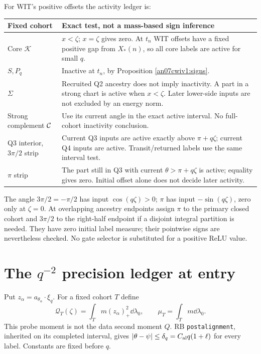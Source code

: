 \documentclass[11pt]{article}
\numberwithin{equation}{section}
\theoremstyle{remark}\newtheorem{remark}[theorem]{Remark}
\newcommand{\KK}{\mathcal K}\newcommand{\BB}{\mathcal B}
\begin{document}
For WIT's positive offsets the activity ledger is:
\begin{center}\small
\begin{tabular}{p{}p{}}\toprule
Fixed cohort & Exact test, not a mass-based sign inference\\\midrule
Core \(\KK\) & \(x<\zeta\); \(x=\zeta\) gives zero.
 At \(t_n\) WIT offsets have a fixed positive gap from
 \(X_*(n)\), so all core labels are active for small \(q\).\\
\(S,P_q\) & Inactive at \(t_n\), by Proposition
 \ref{an07cwiv1:signs}.\\
\(\Sigma\) & Recruited Q2 ancestry does not imply inactivity.
 A part in a strong chart is active when \(x<\zeta\).
 Later lower-side inputs are not excluded by an energy norm.\\
Strong complement \(\mathcal C\) & Use its current angle in the exact
 active interval. No full-cohort inactivity conclusion.\\
Q3 interior, \(3\pi/2\) strip & Current Q3 inputs are active
 exactly above \(\pi+q\zeta\); current Q4 inputs are active.
 Transit/returned labels use the same interval test.\\
\(\pi\) strip & The part still in Q3 with current
 \(\theta>\pi+q\zeta\) is active; equality gives zero.
 Initial offset alone does not decide later activity.\\\bottomrule
\end{tabular}
\end{center}
The angle \(3\pi/2=-\pi/2\) has input \(\cos(q\zeta)>0\);
\(\pi\) has input \(-\sin(q\zeta)\), zero only at \(\zeta=0\).
At overlapping ancestry endpoints assign \(\pi\) to the primary
closed cohort and \(3\pi/2\) to the right-half endpoint if a
disjoint integral partition is needed. They have zero initial
label measure; their pointwise signs are nevertheless checked.
No gate selector is substituted for a positive ReLU value.

\section{The \texorpdfstring{\(q^{-2}\)}{q-inverse-squared} precision ledger at entry}
\label{an07cwiv1:precision}
Put \(z_\alpha=a_{\theta_\alpha}\cdot\xi_q\). For a fixed
cohort \(T\) define
\begin{equation}
 \mathcal Q_T(\zeta)=\int_Tm(z_\alpha)_+^2\dd\lambda_0,
 \qquad \mu_T=\int_Tm\dd\lambda_0 .
 \label{an07cwiv1:Qprobe}
\end{equation}
This probe moment is not the data second moment \(Q\).
RB \texttt{postalignment}, inherited on its completed interval,
gives \(|\theta-\psi|\le\delta_q=C_{\rm al}q(1+\ell)\)
for every label. Constants are fixed before \(q\).
\end{document}
